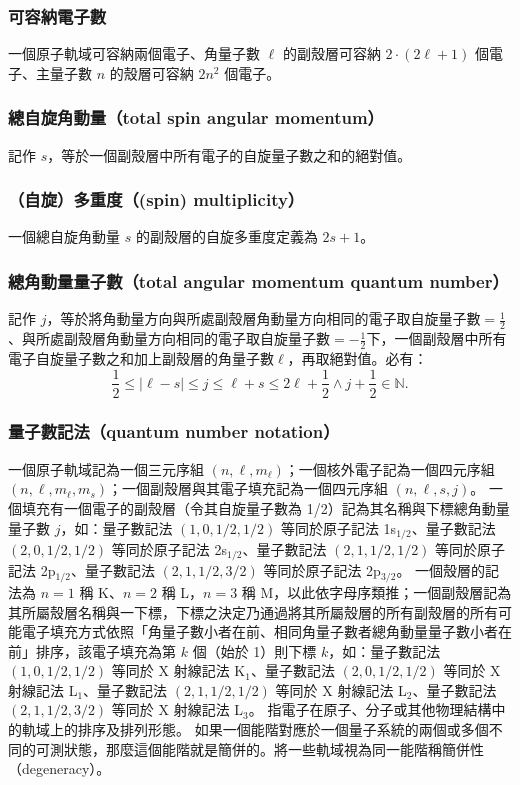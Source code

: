 \documentclass[a4paper,12pt]{report}
\begin{document}
\subsubsection{可容納電子數}
一個原子軌域可容納兩個電子、角量子數 $\ell$ 的副殼層可容納 $2\cdot(2\ell+1)$ 個電子、主量子數 $n$ 的殼層可容納 $2n^2$ 個電子。
\subsubsection{總自旋角動量（total spin angular momentum）}
記作 $s$，等於一個副殼層中所有電子的自旋量子數之和的絕對值。
\subsubsection{（自旋）多重度（(spin) multiplicity）}
一個總自旋角動量 $s$ 的副殼層的自旋多重度定義為 $2s+1$。
\subsubsection{總角動量量子數（total angular momentum quantum number）}
記作 $j$，等於將角動量方向與所處副殼層角動量方向相同的電子取自旋量子數$=\frac{1}{2}$、與所處副殼層角動量方向相同的電子取自旋量子數$=-\frac{1}{2}$下，一個副殼層中所有電子自旋量子數之和加上副殼層的角量子數$\ell$，再取絕對值。必有：
\[\frac{1}{2}\leq |\ell-s|\leq j\leq \ell+s\leq 2\ell+\frac{1}{2}\land j+\frac{1}{2}\in\mathbb{N}.\]
\subsubsection{量子數記法（quantum number notation）}
一個原子軌域記為一個三元序組 $(n,\ell,m_\ell)$；一個核外電子記為一個四元序組 $(n, \ell, m_{\ell}, m_s)$；一個副殼層與其電子填充記為一個四元序組 $(n, \ell, s, j)$。
一個填充有一個電子的副殼層（令其自旋量子數為 1/2）記為其名稱與下標總角動量量子數 $j$，如：量子數記法 $(1,0,1/2,1/2)$ 等同於原子記法 1s$_{1/2}$、量子數記法 $(2,0,1/2,1/2)$ 等同於原子記法 2s$_{1/2}$、量子數記法 $(2,1,1/2,1/2)$ 等同於原子記法 2p$_{1/2}$、量子數記法 $(2,1,1/2,3/2)$ 等同於原子記法 2p$_{3/2}$。
一個殼層的記法為 $n=1$ 稱 K、$n=2$ 稱 L，$n=3$ 稱 M，以此依字母序類推；一個副殼層記為其所屬殼層名稱與一下標，下標之決定乃通過將其所屬殼層的所有副殼層的所有可能電子填充方式依照「角量子數小者在前、相同角量子數者總角動量量子數小者在前」排序，該電子填充為第 $k$ 個（始於 1）則下標 $k$，如：量子數記法 $(1,0,1/2,1/2)$ 等同於 X 射線記法 K$_1$、量子數記法 $(2,0,1/2,1/2)$ 等同於 X 射線記法 L$_1$、量子數記法 $(2,1,1/2,1/2)$ 等同於 X 射線記法 L$_2$、量子數記法 $(2,1,1/2,3/2)$ 等同於 X 射線記法 L$_3$。
指電子在原子、分子或其他物理結構中的軌域上的排序及排列形態。 
如果一個能階對應於一個量子系統的兩個或多個不同的可測狀態，那麼這個能階就是簡併的。將一些軌域視為同一能階稱簡併性（degeneracy）。
\end{document}
